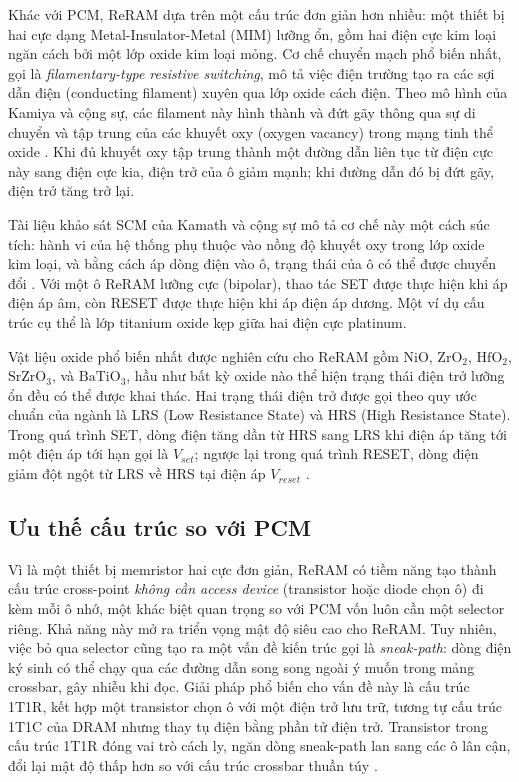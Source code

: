 \documentclass[12pt,a4paper]{article}
\begin{document}
Khác với PCM, ReRAM dựa trên một cấu trúc đơn giản hơn nhiều: một thiết bị hai cực dạng Metal-Insulator-Metal (MIM) lưỡng ổn, gồm hai điện cực kim loại ngăn cách bởi một lớp oxide kim loại mỏng. Cơ chế chuyển mạch phổ biến nhất, gọi là \textit{filamentary-type resistive switching}, mô tả việc điện trường tạo ra các sợi dẫn điện (conducting filament) xuyên qua lớp oxide cách điện. Theo mô hình của Kamiya và cộng sự, các filament này hình thành và đứt gãy thông qua sự di chuyển và tập trung của các khuyết oxy (oxygen vacancy) trong mạng tinh thể oxide \cite{meena2014}. Khi đủ khuyết oxy tập trung thành một đường dẫn liên tục từ điện cực này sang điện cực kia, điện trở của ô giảm mạnh; khi đường dẫn đó bị đứt gãy, điện trở tăng trở lại.

Tài liệu khảo sát SCM của Kamath và cộng sự mô tả cơ chế này một cách súc tích: hành vi của hệ thống phụ thuộc vào nồng độ khuyết oxy trong lớp oxide kim loại, và bằng cách áp dòng điện vào ô, trạng thái của ô có thể được chuyển đổi \cite{kamath2019}. Với một ô ReRAM lưỡng cực (bipolar), thao tác SET được thực hiện khi áp điện áp âm, còn RESET được thực hiện khi áp điện áp dương. Một ví dụ cấu trúc cụ thể là lớp titanium oxide kẹp giữa hai điện cực platinum.

Vật liệu oxide phổ biến nhất được nghiên cứu cho ReRAM gồm NiO, $\mathrm{ZrO_2}$, $\mathrm{HfO_2}$, $\mathrm{SrZrO_3}$, và $\mathrm{BaTiO_3}$, hầu như bất kỳ oxide nào thể hiện trạng thái điện trở lưỡng ổn đều có thể được khai thác. Hai trạng thái điện trở được gọi theo quy ước chuẩn của ngành là LRS (Low Resistance State) và HRS (High Resistance State). Trong quá trình SET, dòng điện tăng dần từ HRS sang LRS khi điện áp tăng tới một điện áp tới hạn gọi là $V_{set}$; ngược lại trong quá trình RESET, dòng điện giảm đột ngột từ LRS về HRS tại điện áp $V_{reset}$ \cite{meena2014}.

\subsection{Ưu thế cấu trúc so với PCM}

Vì là một thiết bị memristor hai cực đơn giản, ReRAM có tiềm năng tạo thành cấu trúc cross-point \textit{không cần access device} (transistor hoặc diode chọn ô) đi kèm mỗi ô nhớ, một khác biệt quan trọng so với PCM vốn luôn cần một selector riêng. Khả năng này mở ra triển vọng mật độ siêu cao cho ReRAM. Tuy nhiên, việc bỏ qua selector cũng tạo ra một vấn đề kiến trúc gọi là \textit{sneak-path}: dòng điện ký sinh có thể chạy qua các đường dẫn song song ngoài ý muốn trong mảng crossbar, gây nhiễu khi đọc. Giải pháp phổ biến cho vấn đề này là cấu trúc 1T1R, kết hợp một transistor chọn ô với một điện trở lưu trữ, tương tự cấu trúc 1T1C của DRAM nhưng thay tụ điện bằng phần tử điện trở. Transistor trong cấu trúc 1T1R đóng vai trò cách ly, ngăn dòng sneak-path lan sang các ô lân cận, đổi lại mật độ thấp hơn so với cấu trúc crossbar thuần túy \cite{meena2014}.
\end{document}
